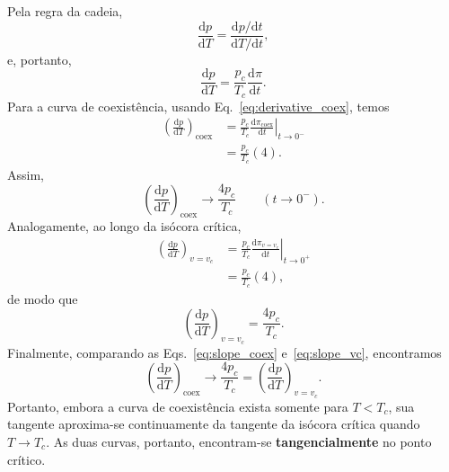 \documentclass[11pt,a4paper]{article}
\renewcommand{\dd}{\mathrm{d}}
\begin{document}
%
Pela regra da cadeia,
%
\begin{equation}
    \frac{\dd p}{\dd T}
    =
    \frac{\dd p/\dd t}{\dd T/\dd t},
\end{equation}
%
e, portanto,
%
\begin{equation}
    \frac{\dd p}{\dd T}
    =
    \frac{p_c}{T_c}
    \frac{\dd\pi}{\dd t}.
\end{equation}
%
Para a curva de coexistência, usando
Eq.~\eqref{eq:derivative_coex}, temos
%
\begin{align}
    \left(\frac{\dd p}{\dd T}\right)_{\mathrm{coex}}
    &=
    \frac{p_c}{T_c}
    \left.
    \frac{\dd\pi_{\mathrm{coex}}}{\dd t}
    \right|_{t\to0^-}
    \nonumber\\
    &=
    \frac{p_c}{T_c}(4).
\end{align}
%
Assim,
%
\begin{equation}
    \boxed{
    \left(\frac{\dd p}{\dd T}\right)_{\mathrm{coex}}
    \longrightarrow
    \frac{4p_c}{T_c}
    \qquad
    (t\to0^-).
    }
\label{eq:slope_coex}
\end{equation}
%
Analogamente, ao longo da isócora crítica,
%
\begin{align}
    \left(\frac{\dd p}{\dd T}\right)_{v=v_c}
    &=
    \frac{p_c}{T_c}
    \left.
    \frac{\dd\pi_{v=v_c}}{\dd t}
    \right|_{t\to0^+}
    \nonumber\\
    &=
    \frac{p_c}{T_c}(4),
\end{align}
%
de modo que
%
\begin{equation}
    \boxed{
    \left(\frac{\dd p}{\dd T}\right)_{v=v_c}
    =
    \frac{4p_c}{T_c}.
    }
\label{eq:slope_vc}
\end{equation}
%
Finalmente, comparando as Eqs.~\eqref{eq:slope_coex}
e~\eqref{eq:slope_vc}, encontramos
%
\begin{equation}
    \boxed{
    \left(\frac{\dd p}{\dd T}\right)_{\mathrm{coex}}
    \longrightarrow
    \frac{4p_c}{T_c}
    =
    \left(\frac{\dd p}{\dd T}\right)_{v=v_c}.
    }
\end{equation}
%
Portanto, embora a curva de coexistência exista somente para
$T<T_c$, sua tangente aproxima-se continuamente da tangente da
isócora crítica quando $T\to T_c$. As duas curvas, portanto,
encontram-se \textbf{tangencialmente} no ponto crítico.
\end{document}
